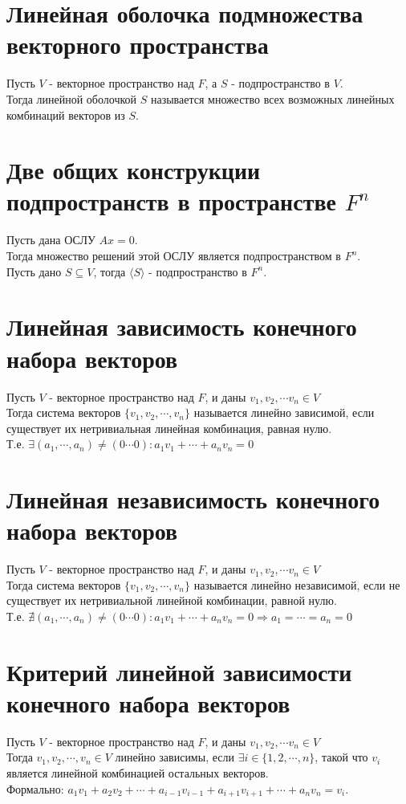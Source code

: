\documentclass[a4paper,11pt]{report}
\begin{document}
\section{Линейная оболочка подмножества векторного пространства}
Пусть $V$ - векторное пространство над $F$, а $S$ - подпространство в $V$.\\
Тогда линейной оболочкой $S$ называется множество всех возможных линейных комбинаций
векторов из $S$.
\section{Две общих конструкции подпространств в пространстве $F^n$}
Пусть дана ОСЛУ $Ax = 0$.\\
Тогда множество решений этой ОСЛУ является подпространством в $F^n$.\\
Пусть дано $S \subseteq V$, тогда $\langle S \rangle$ - подпространство в $F^n$.
\section{Линейная зависимость конечного набора векторов}
Пусть $V$ - векторное пространство над $F$, и даны $v_1, v_2, \cdots v_n \in V$\\
Тогда система векторов $\{ v_1, v_2, \cdots, v_n \}$ называется линейно зависимой,
если существует их нетривиальная линейная комбинация, равная нулю.\\
Т.е. $\exists (a_1, \cdots, a_n) \neq (0 \cdots 0): a_1v_1 + \cdots + a_nv_n = 0$\\
\section{Линейная независимость конечного набора векторов}
Пусть $V$ - векторное пространство над $F$, и даны $v_1, v_2, \cdots v_n \in V$\\
Тогда система векторов $\{ v_1, v_2, \cdots, v_n \}$ называется линейно независимой,
если не существует их нетривиальной линейной комбинации, равной нулю.\\
Т.е. $\nexists (a_1, \cdots, a_n) \neq (0 \cdots 0): a_1v_1 + \cdots + a_nv_n = 0 \Rightarrow a_1 = \cdots = a_n = 0$\\
\section{Критерий линейной зависимости конечного набора векторов}
Пусть $V$ - векторное пространство над $F$, и даны $v_1, v_2, \cdots v_n \in V$\\
Тогда $v_1, v_2, \cdots, v_n \in V$ линейно зависимы, если $\exists i \in \{1, 2, \cdots, n\}$, такой что
$v_i$ является линейной комбинацией остальных векторов.\\
Формально: $a_1v_1 + a_2v_2 + \cdots + a_{i-1}v_{i-1} + a_{i+1}v_{i+1} + \cdots + a_nv_n = v_i$.
\end{document}
